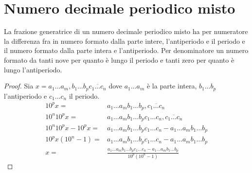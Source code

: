 \section{Numero decimale periodico misto}\label{sec:numero-decimale-periodico-misto}
\begin{thm}\label{thm:Numero-decimale-periodico-misto}
La frazione generatrice di un numero decimale periodico misto ha per numeratore la differenza fra in numero formato dalla parte intere, l'antiperiodo e il periodo e il numero formato dalla parte intera e l'antiperiodo. Per denominatore un numero formato da tanti nove per quanto è lungo il periodo e tanti zero per quanto è lungo l'antiperiodo.  
\end{thm}
\begin{proof}
	Sia $x=a_1\dots a_m,b_1\dots b_p \overline{c_1\dots c_n}$ dove $a_1\dots a_m$ è la parte intera, $b_1\dots b_p$ l'antiperiodo e $c_1\dots c_n$ il periodo. 
	\begin{align*}
	10^px=&a_1\dots a_m b_1\dots b_p,\overline{c_1\dots c_n}\\
	10^n10^px=&a_1\dots a_m b_1\dots b_p c_1\dots c_n,\overline{c_1\dots c_n}\\
	10^n10^px-10^px=&a_1\dots a_m b_1\dots b_p c_1\dots c_n-a_1\dots a_m b_1\dots b_p\\
	10^px(10^n-1)=&a_1\dots a_m b_1\dots b_p c_1\dots c_n-a_1\dots a_m b_1\dots b_p\\
	x=&\frac{a_1\dots a_m b_1\dots b_p c_1\dots c_n-a_1\dots a_m b_1\dots b_p}{10^p(10^n-1)}
	\end{align*}
\end{proof}